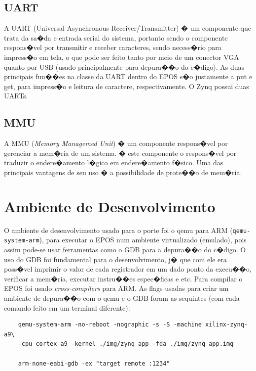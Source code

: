 \documentclass{ufscThesis/ufscThesis} %
\begin{document}
\subsection{UART}
A UART (Universal Asynchronous Receiver/Transmitter) � um componente que trata da sa�da e entrada serial do sistema, portanto sendo o componente respons�vel por transmitir e receber caracteres, sendo necess�rio para impress�o em tela, o que pode ser feito tanto por meio de um conector VGA quanto por USB (usado principalmente para depura��o do c�digo). As duas principais fun��es na classe da UART dentro do EPOS s�o justamente a put e get, para impress�o e leitura de caractere, respectivamente. O Zynq possui duas UARTs.



\subsection{MMU} %

A MMU (\emph{Memory Managemed Unit}) � um componente respons�vel por gerenciar a mem�ria de um sistema. � este componente o respons�vel por traduzir o endere�amento l�gico em endere�amento f�sico. Uma das principais vantagens de seu uso � a possibilidade de prote��o de mem�ria.

\section{Ambiente de Desenvolvimento}

O ambiente de desenvolvimento usado para o porte foi o qemu para ARM (\verb+qemu-system-arm+), para executar o EPOS num ambiente virtualizado (emulado), pois assim pode-se usar ferramentas como o GDB para a depura��o do c�digo. O uso do GDB foi fundamental para o desenvolvimento, j� que com ele era poss�vel imprimir o valor de cada registrador em um dado ponto da execu��o, verificar a mem�ria, executar instru��es espec�ficas e etc. Para compilar o EPOS foi usado \emph{cross-compilers} para ARM. As flags usadas para criar um ambiente de depura��o com o qemu e o GDB foram as sequintes (com cada comando feito em um terminal diferente):
\begin{verbatim}
	qemu-system-arm -no-reboot -nographic -s -S -machine xilinx-zynq-a9\
	-cpu cortex-a9 -kernel ./img/zynq_app -fda ./img/zynq_app.img

	arm-none-eabi-gdb -ex "target remote :1234"
\end{verbatim}
\end{document}
